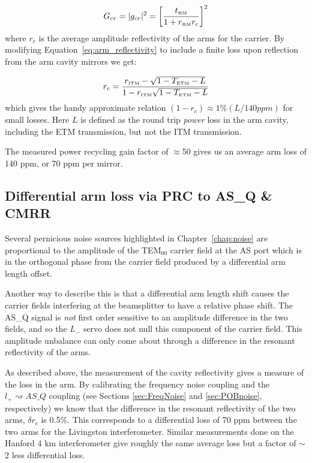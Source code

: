 \begin{equation}
G_{cr} = |g_{cr}|^2 
       = \left [\frac{t_{\mbox{\tiny RM}}}{1+r_{\mbox{\tiny RM}}r_c} \right ]^2
\end{equation}
where $r_c$ is the average amplitude reflectivity of the arms for the carrier. By
modifying Equation~\ref{eq:arm_reflectivity} to include a finite loss upon reflection
from the arm cavity mirrors we get:

\begin{equation}
r_c = \frac{r_{\mbox{\tiny ITM}} - \sqrt{1-T_{\mbox{\tiny ETM}}-L}}
           {1 - r_{\mbox{\tiny ITM}} \sqrt{1-T_{\mbox{\tiny ETM}}-L}}
\label{eq:arm_reflectivity_with_loss}
\end{equation}
which gives the handy approximate relation $(1-r_c) \approx 1\% (L / 140 ppm)$
for small losses. Here $L$ is defined as the round trip \emph{power} loss
in the arm cavity, including the ETM transmission, but not the ITM
transmission.

The measured power recycling gain factor of $\approx$50 gives us an average
arm loss of 140 ppm, or 70 ppm per mirror.


\subsection{Differential arm loss via PRC to AS\_Q \& CMRR}

Several pernicious noise sources highlighted in Chapter~\ref{chap:noise}
are proportional to the amplitude of the TEM$_{00}$ carrier field at the
AS port which is in the orthogonal phase from the carrier field produced
by a differential arm length offset.

Another way to describe this is that a differential arm length shift
causes the carrier fields interfering at the beamsplitter to have a relative
phase shift. The AS\_Q signal is \emph{not} first order sensitive to an
amplitude difference in the two fields, and so the $L_-$ servo does not
null this component of the carrier field. This amplitude unbalance can
only come about through a difference in the resonant reflectivity of the
arms.

As described above, the measurement of the cavity reflectivity gives a 
measure of the loss in the arm. By calibrating the frequency noise
coupling and the $l_+ \rightsquigarrow AS\_Q$ coupling (see Sections
\ref{sec:FreqNoise} and \ref{sec:POBnoise}, respectively) we know that 
the difference in
the resonant reflectivity of the two arms, $\delta r_c$ is 0.5\%. This
corresponds to a differential loss of 70 ppm between the two arms for the
Livingston interferometer. Similar measurements done on the Hanford 4 km 
interferometer give roughly
the same average loss but a factor of $\sim$2 less differential loss.

